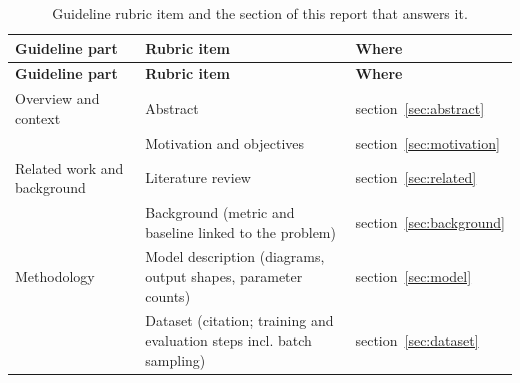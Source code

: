 \documentclass[11pt,a4paper]{article}
\begin{document}
\begin{center}\small\renewcommand{\arraystretch}{1.15}
\begin{longtable}{>{\raggedright\arraybackslash}p{3.91cm}>{\raggedright\arraybackslash}p{8.40cm}>{\raggedright\arraybackslash}p{2.93cm}}
\caption{Guideline rubric item and the section of this report that answers it.}\\
\toprule
\textbf{\hspace{0pt}Guideline part} & \textbf{\hspace{0pt}Rubric item} & \textbf{\hspace{0pt}Where}\\\midrule\endfirsthead
\toprule
\textbf{\hspace{0pt}Guideline part} & \textbf{\hspace{0pt}Rubric item} & \textbf{\hspace{0pt}Where}\\\midrule\endhead
\bottomrule\endfoot
\hspace{0pt}Overview and context & \hspace{0pt}Abstract & \hspace{0pt}section~\ref{sec:abstract}\\
\hspace{0pt} & \hspace{0pt}Motivation and objectives & \hspace{0pt}section~\ref{sec:motivation}\\
\hspace{0pt}Related work and background & \hspace{0pt}Literature review & \hspace{0pt}section~\ref{sec:related}\\
\hspace{0pt} & \hspace{0pt}Background (metric and baseline linked to the problem) & \hspace{0pt}section~\ref{sec:background}\\
\hspace{0pt}Methodology & \hspace{0pt}Model description (diagrams, output shapes, parameter counts) & \hspace{0pt}section~\ref{sec:model}\\
\hspace{0pt} & \hspace{0pt}Dataset (citation; training and evaluation steps incl. batch sampling) & \hspace{0pt}section~\ref{sec:dataset}\\

\end{longtable}
\end{center}
\end{document}
